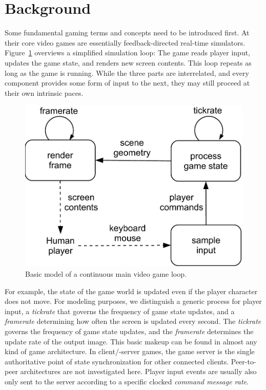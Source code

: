 \section{Background}
\label{sec:background}

Some fundamental gaming terms and concepts need to be introduced first.
At their core video games are essentially feedback-directed real-time simulators. Figure~\ref{fig:gameloop1} overviews a simplified simulation loop: The game reads player input, updates the game state, and renders new screen contents. This loop repeats as long as the game is running. While the three parts are interrelated, and every component provides some form of input to the next, they may still proceed at their own intrinsic paces.


\begin{figure}[!t]
	\centering
	\includegraphics[width=0.8\columnwidth]{../../../models/game_loop.pdf}
	\caption{Basic model of a continuous main video game loop.}
	\label{fig:gameloop1}
\end{figure}

For example, the state of the game world is updated even if the player character does not move. For modeling purposes, we distinguish a generic process for player input, a \textit{tickrate} that governs the frequency of game state updates, and a \textit{framerate} determining how often the screen is updated every second. The \textit{tickrate} governs the frequency of game state updates, and the \textit{framerate} determines the update rate of the output image. This basic makeup can be found in almost any kind of game architecture.
In client/-server games, the game server is the single authoritative point of state synchronization for other connected clients. Peer-to-peer architectures are not investigated here. Player input events are usually also only sent to the server according to a specific clocked \textit{command message rate}.

